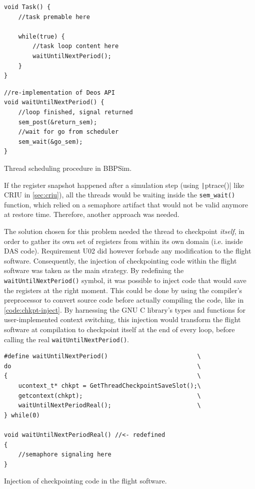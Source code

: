 \begin{listing}[htpb]
	\centering
	\begin{minipage}{.5\textwidth}
	\begin{verbatim}
void Task() {
	//task premable here
	
	while(true) {
		//task loop content here
		waitUntilNextPeriod();
	}
}
	\end{verbatim}
	\end{minipage}%
	\begin{minipage}{.5\textwidth}
	\begin{verbatim}
//re-implementation of Deos API
void waitUntilNextPeriod() {
	//loop finished, signal returned
	sem_post(&return_sem);
	//wait for go from scheduler 
	sem_wait(&go_sem);
}
	\end{verbatim}
	\end{minipage}
	\caption{Thread scheduling procedure in BBPSim.}
	\label{code:thr-sched-bbpsim}
\end{listing}

If the register snapshot happened after a simulation step (using \texttt|ptrace()| like \gls{CRIU} in \autoref{sec:criu}), all the threads would be waiting inside the \texttt{sem_wait()} function, which relied on a semaphore artifact that would not be valid anymore at restore time. Therefore, another approach was needed.

The solution chosen for this problem needed the thread to checkpoint \textit{itself}, in order to gather its own set of registers from within its own domain (i.e. inside DAS code). Requirement U02 did however forbade any modification to the flight software. Consequently, the injection of checkpointing code within the flight software was taken as the main strategy. By redefining the \texttt{waitUntilNextPeriod()} symbol, it was possible to inject code that would save the registers at the right moment. This could be done by using the compiler's preprocessor to convert source code before actually compiling the code, like in \autoref{code:chkpt-inject}. By harnessing the GNU C library's types and functions for user-implemented context switching\cite{online:getcontext}, this injection would transform the flight software at compilation to checkpoint itself at the end of every loop, before calling the real \texttt{waitUntilNextPeriod()}. 
\begin{listing}[htpb]
	\centering
	\begin{verbatim}
#define waitUntilNextPeriod()                         \
do                                                    \
{                                                     \
	ucontext_t* chkpt = GetThreadCheckpointSaveSlot();\
	getcontext(chkpt);                                \
	waitUntilNextPeriodReal();                        \ 
} while(0)

void waitUntilNextPeriodReal() //<- redefined
{
	//semaphore signaling here
}
	\end{verbatim}
	\caption{Injection of checkpointing code in the flight software.}
	\label{code:chkpt-inject}
\end{listing}

